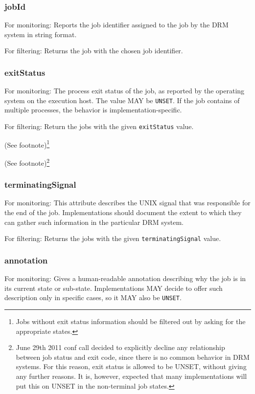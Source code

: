\documentclass{article}
\newcommand{\h}[1]{\lstinline|#1|}
\newcommand{\rat}[1]{ {\tiny(See footnote)}\footnote{#1} }
\begin{document}
\subsubsection{jobId}

For monitoring: Reports the job identifier assigned to the job by the DRM system in string format.

For filtering: Returns the job with the chosen job identifier.

\subsubsection{exitStatus}

For monitoring: The process exit status of the job, as reported by the operating system on the execution host. The value MAY be \h{UNSET}. If the job contains of multiple processes, the behavior is implementation-specific.

For filtering: Return the jobs with the given \h{exitStatus} value. 

\rat{Jobs without exit status information should be filtered out by asking for the appropriate states.}

\rat{June 29th 2011 conf call decided to explicitly decline any relationship between job status and exit code, since there is no common behavior in DRM systems. For this reason, exit status is allowed to be UNSET, without giving any further reasons. It is, however, expected that many implementations will put this on UNSET in the non-terminal job states.
}

\subsubsection{terminatingSignal}

For monitoring: This attribute describes the UNIX signal that was responsible for the end of the job. Implementations should document the extent to which they can gather such information in the particular DRM system.

For filtering: Returns the jobs with the given \h{terminatingSignal} value.

\subsubsection{annotation}

For monitoring: Gives a human-readable annotation describing why the job is in its current state or sub-state. Implementations MAY decide to offer such description only in specific cases, so it MAY also be \h{UNSET}.
\end{document}

